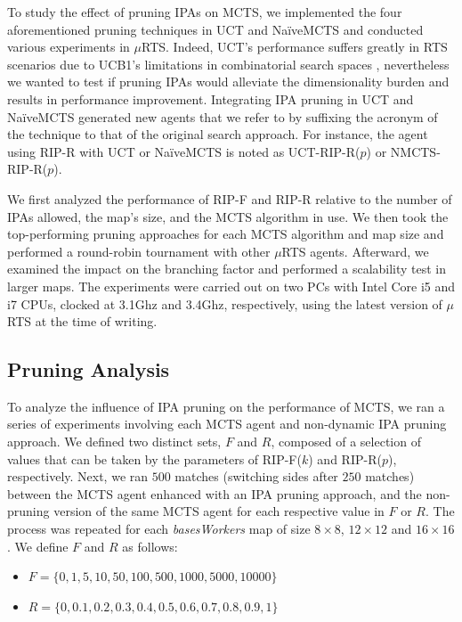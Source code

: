 \documentclass[conference]{IEEEtran}
\newcommand{\mRTS}{$\mu$RTS}
\begin{document}
To study the effect of pruning IPAs on MCTS, we implemented the four aforementioned pruning techniques in UCT and NaïveMCTS and conducted various experiments in \mRTS{}. Indeed, UCT's performance suffers greatly in RTS scenarios due to UCB1's limitations in combinatorial search spaces \cite{ontanon_combinatorial_2017}, nevertheless we wanted to test if pruning IPAs would alleviate the dimensionality burden and results in performance improvement. Integrating IPA pruning in UCT and NaïveMCTS generated new agents that we refer to by suffixing the acronym of the technique to that of the original search approach. For instance, the agent using RIP-R with UCT or NaïveMCTS is noted as UCT-RIP-R($p$) or NMCTS-RIP-R($p$).

We first analyzed the performance of RIP-F and RIP-R relative to the number of IPAs allowed, the map's size, and the MCTS algorithm in use. We then took the top-performing pruning approaches for each MCTS algorithm and map size and performed a round-robin tournament with other \mRTS{} agents. Afterward, we examined the impact on the branching factor and performed a scalability test in larger maps. The experiments were carried out on two PCs with Intel Core i5 and i7 CPUs, clocked at 3.1Ghz and 3.4Ghz, respectively, using the latest version of \mRTS{} at the time of writing.


\subsection{Pruning Analysis}

To analyze the influence of IPA pruning on the performance of MCTS, we ran a series of experiments involving each MCTS agent and non-dynamic IPA pruning approach. We defined two distinct sets, $F$ and $R$, composed of a selection of values that can be taken by the parameters of RIP-F($k$) and RIP-R($p$), respectively. Next, we ran $500$ matches (switching sides after $250$ matches) between the MCTS agent enhanced with an IPA pruning approach, and the non-pruning version of the same MCTS agent for each respective value in $F$ or $R$. The process was repeated for each \textit{basesWorkers} map of size $8\times8$, $12\times12$ and $16\times16$. We define $F$ and $R$ as follows:

\begin{itemize}
\item $F = \{0, 1, 5, 10, 50, 100, 500, 1000, 5000, 10000\}$
\item $R = \{0, 0.1, 0.2, 0.3, 0.4, 0.5, 0.6, 0.7, 0.8, 0.9, 1\}$
\end{itemize}
\end{document}
